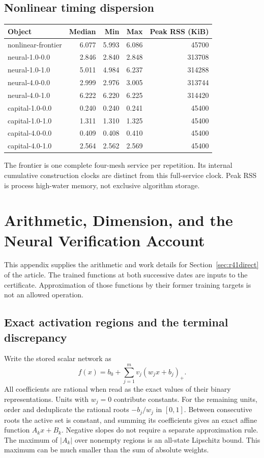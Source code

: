 \documentclass[ecta,nameyear,draft]{econsocart}
\theoremstyle{definition}
\theoremstyle{remark}
\begin{document}
\subsection{Nonlinear timing dispersion}
\begin{tabular}{lrrrr}\toprule Object & Median & Min & Max & Peak RSS (KiB)\\\midrule
nonlinear-frontier & 6.077 & 5.993 & 6.086 & 45700\\
neural-1.0-0.0 & 2.846 & 2.840 & 2.848 & 313708\\
neural-1.0-1.0 & 5.011 & 4.984 & 6.237 & 314288\\
neural-4.0-0.0 & 2.999 & 2.976 & 3.005 & 313744\\
neural-4.0-1.0 & 6.222 & 6.220 & 6.225 & 314420\\
capital-1.0-0.0 & 0.240 & 0.240 & 0.241 & 45400\\
capital-1.0-1.0 & 1.311 & 1.310 & 1.325 & 45400\\
capital-4.0-0.0 & 0.409 & 0.408 & 0.410 & 45400\\
capital-4.0-1.0 & 2.564 & 2.562 & 2.569 & 45400\\
\bottomrule\end{tabular}
\par\medskip The frontier is one complete four-mesh service per repetition. Its internal cumulative construction clocks are distinct from this full-service clock. Peak RSS is process high-water memory, not exclusive algorithm storage.

\section{Arithmetic, Dimension, and the Neural Verification Account}
\label{app:r41arithmetic}
This appendix supplies the arithmetic and work details for
Section~\ref{sec:r41direct} of the article. The trained functions at both
successive dates are inputs to the certificate. Approximation of those
functions by their former training targets is not an allowed operation.

\subsection{Exact activation regions and the terminal discrepancy}
Write the stored scalar network as
\[
 f(x)=b_0+\sum_{j=1}^m v_j(w_jx+b_j)_+.
\]
All coefficients are rational when read as the exact values of their binary
representations. Units with $w_j=0$ contribute constants. For the remaining
units, order and deduplicate the rational roots $-b_j/w_j$ in $[0,1]$.
Between consecutive roots the active set is constant, and summing its
coefficients gives an exact affine function $A_kx+B_k$. Negative slopes do
not require a separate approximation rule. The maximum of $|A_k|$ over
nonempty regions is an all-state Lipschitz bound. This maximum can be much
smaller than the sum of absolute weights.
\end{document}
